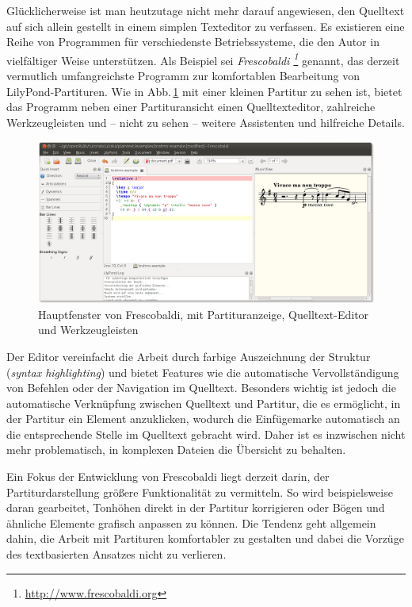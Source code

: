 \documentclass[DIV=12]{scrreprt}
\begin{document}
\bigskip
Glücklicherweise ist man heutzutage nicht mehr darauf angewiesen, den Quelltext auf sich allein gestellt in einem simplen Texteditor zu verfassen.
Es existieren eine Reihe von Programmen für verschiedenste Betriebssysteme, die den Autor in vielfältiger Weise unterstützen.
Als Beispiel sei \textit{Frescobaldi%
\footnote{\url{http://www.frescobaldi.org}}}
genannt, das derzeit vermutlich umfangreichste Programm zur komfortablen Bearbeitung von LilyPond-Partituren.
Wie in Abb.\,\ref{fig:pt_fb-main-window} mit einer kleinen Partitur zu sehen ist, bietet das Programm neben einer Partituransicht einen Quelltexteditor, zahlreiche Werkzeugleisten und -- nicht zu sehen -- weitere Assistenten und hilfreiche Details.
	\begin{figure}
	\includegraphics[max width=\textwidth]{examples/frescobaldi/main-window}
	\caption{Hauptfenster von Frescobaldi, mit Partituranzeige, Quelltext-Editor und Werkzeugleisten}
	\label{fig:pt_fb-main-window}
	\end{figure}
Der Editor vereinfacht die Arbeit durch farbige Auszeichnung der Struktur (\emph{syntax highlighting}) und bietet Features wie die automatische Vervollständigung von Befehlen oder der Navigation im Quelltext.
Besonders wichtig ist jedoch die automatische Verknüpfung zwischen Quelltext und Partitur, die es ermöglicht, in der Partitur ein Element anzuklicken, wodurch die Einfügemarke automatisch an die entsprechende Stelle im Quelltext gebracht wird.
Daher ist es inzwischen nicht mehr problematisch, in komplexen Dateien die Übersicht zu behalten.

Ein Fokus der Entwicklung von Frescobaldi liegt derzeit darin, der Partiturdarstellung größere Funktionalität zu vermitteln.
So wird beispielsweise daran gearbeitet, Tonhöhen direkt in der Partitur  korrigieren oder Bögen und ähnliche Elemente grafisch anpassen zu können.
Die Tendenz geht allgemein dahin, die Arbeit mit Partituren komfortabler zu gestalten und dabei die Vorzüge des textbasierten Ansatzes nicht zu verlieren.
\end{document}
